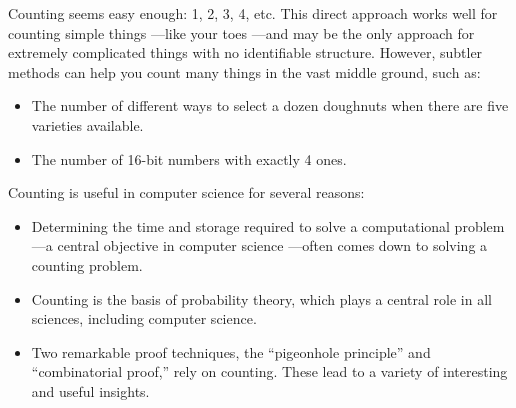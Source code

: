 \iffalse
Can you find two such subsets?  This is a challenging computational
problem.  But we'll prove that such subsets must exist!  This is the sort
of weird conclusion one can reach by tricky use of counting, the topic of
this chapter.
\fi


Counting seems easy enough: 1, 2, 3, 4, etc.  This direct approach works
well for counting simple things ---like your toes ---and may be the only
approach for extremely complicated things with no identifiable structure.
However, subtler methods can help you count many things in the vast middle
ground, such as:

\begin{itemize}

\item The number of different ways to select a dozen doughnuts when
there are five varieties available.

\item The number of 16-bit numbers with exactly 4 ones.

\end{itemize}

Counting is useful in computer science for several reasons:

\begin{itemize}

\item Determining the time and storage required to solve a
computational problem ---a central objective in computer science
---often comes down to solving a counting problem.

\item Counting is the basis of probability theory, which plays a central
  role in all sciences, including computer science.

\item Two remarkable proof techniques, the ``pigeonhole principle'' and
  ``combinatorial proof,'' rely on counting.  These lead to a variety of
  interesting and useful insights.

\end{itemize}


